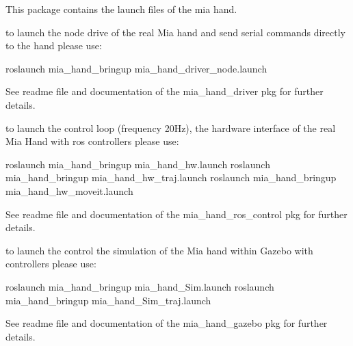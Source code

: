 This package contains the launch files of the mia hand.


\begin{DoxyItemize}
\item to launch the node drive of the real Mia hand and send serial commands directly to the hand please use\+: \begin{DoxyVerb}roslaunch mia_hand_bringup mia_hand_driver_node.launch
\end{DoxyVerb}


See readme file and documentation of the mia\+\_\+hand\+\_\+driver pkg for further details.
\item to launch the control loop (frequency 20Hz), the hardware interface of the real Mia Hand with ros controllers please use\+: \begin{DoxyVerb}roslaunch mia_hand_bringup mia_hand_hw.launch
roslaunch mia_hand_bringup mia_hand_hw_traj.launch
roslaunch mia_hand_bringup mia_hand_hw_moveit.launch
\end{DoxyVerb}


See readme file and documentation of the mia\+\_\+hand\+\_\+ros\+\_\+control pkg for further details.
\item to launch the control the simulation of the Mia hand within Gazebo with controllers please use\+: \begin{DoxyVerb}  roslaunch mia_hand_bringup mia_hand_Sim.launch
  roslaunch mia_hand_bringup mia_hand_Sim_traj.launch
\end{DoxyVerb}


See readme file and documentation of the mia\+\_\+hand\+\_\+gazebo pkg for further details. 
\end{DoxyItemize}